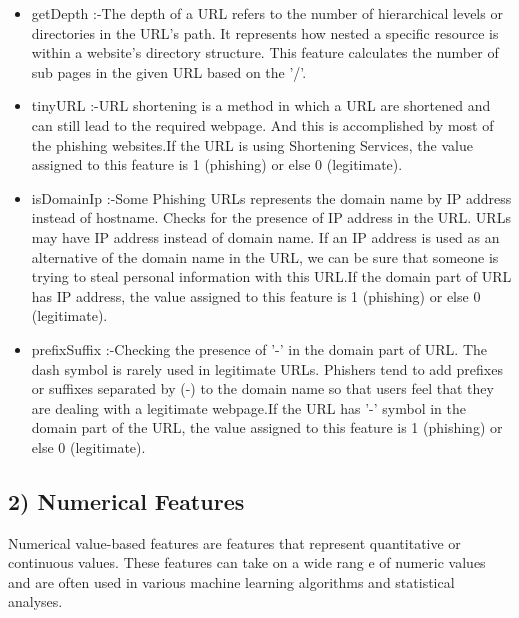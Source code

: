 \documentclass[conference]{IEEEtran}
\begin{document}
\begin{itemize}
  \item getDepth :-{The depth of a URL refers to the number of hierarchical levels or directories in the URL's path. It represents how nested a specific resource is within a website's directory structure. This feature calculates the number of sub pages in the given URL based on the '/'.}
  \item tinyURL :-{URL shortening is a method in which a URL are shortened and can still lead to the required webpage. And this is accomplished by most of the phishing websites.If the URL is using Shortening Services, the value assigned to this feature is 1 (phishing) or else 0 (legitimate).}
  \item isDomainIp :-{Some Phishing URLs represents the domain name by IP address instead of hostname. Checks for the presence of IP address in the URL. URLs may have IP address instead of domain name. If an IP address is used as an alternative of the domain name in the URL, we can be sure that someone is trying to steal personal information with this URL.If the domain part of URL has IP address, the value assigned to this feature is 1 (phishing) or else 0 (legitimate).}
  \item prefixSuffix :-{Checking the presence of '-' in the domain part of URL. The dash symbol is rarely used in legitimate URLs. Phishers tend to add prefixes or suffixes separated by (-) to the domain name so that users feel that they are dealing with a legitimate webpage.If the URL has '-' symbol in the domain part of the URL, the value assigned to this feature is 1 (phishing) or else 0 (legitimate).}
\end{itemize}
\subsection*{2) Numerical Features}
\par Numerical value-based features are features that represent quantitative or continuous values. These features can take on a wide rang
e of numeric values and are often used in various machine learning algorithms and statistical analyses. 
\end{document}
